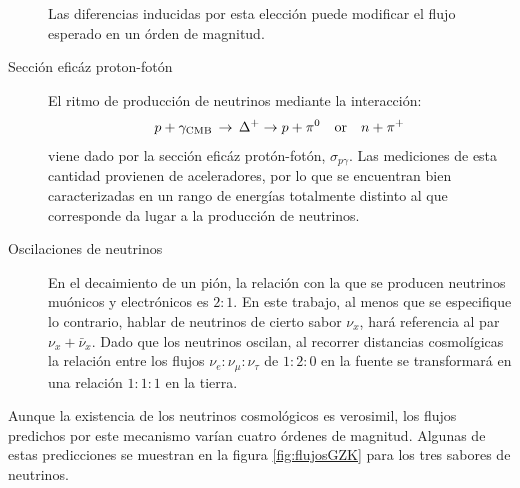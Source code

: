 \begin{description}
	Las diferencias inducidas por esta elecci\'on puede modificar el flujo esperado en un \'orden de magnitud.
	
	\item[Secci\'on efic\'az proton-fot\'on]
	El ritmo de producci\'on de neutrinos mediante la interacci\'on:
	\begin{displaymath}
	p + \gamma_{\rm CMB}\, \rightarrow\, \Delta^{+}  \rightarrow p +\pi^{0}\quad {\rm or}\quad n +\pi^{+}
	\end{displaymath}
	viene dado por la secci\'on efic\'az prot\'on-fot\'on, $\sigma_{p\gamma}$.
	Las mediciones de esta cantidad provienen de aceleradores, por lo que se encuentran bien caracterizadas en un rango de energ\'ias totalmente distinto al que corresponde da lugar a la producci\'on de neutrinos.
	\item[Oscilaciones de neutrinos]
	En el decaimiento de un pi\'on, la relaci\'on con la que se producen neutrinos mu\'onicos y electr\'onicos es $2:1$. 
	En este trabajo, al menos que se especifique lo contrario, hablar de neutrinos de cierto sabor $\nu_x$, har\'a referencia al par $\nu_x + \bar\nu_x$.
	Dado que los neutrinos oscilan, al recorrer distancias cosmol\'igicas la relaci\'on entre los flujos $\nu_e :\nu_\mu :\nu_\tau$ de $1:2:0$ en la fuente se transformar\'a en una relaci\'on $1:1:1$ en la tierra.
	\end{description}
	Aunque la existencia de los neutrinos cosmol\'ogicos es verosimil, los flujos predichos por este mecanismo var\'ian cuatro \'ordenes de magnitud.
	Algunas de estas predicciones se muestran en la figura \ref{fig:flujosGZK} para los tres sabores de neutrinos.
	
